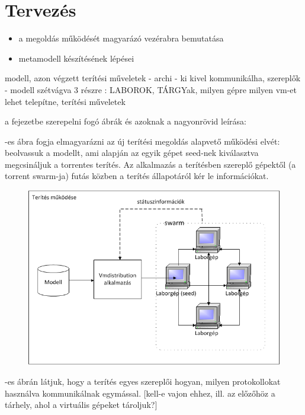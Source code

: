 \chapter{Tervezés}
\label{chp:design}
\begin{itemize}
  \item a megoldás működését magyarázó vezérabra bemutatása
  \item metamodell készítésének lépései
\end{itemize}

modell, azon végzett terítési műveletek
- archi - ki kivel kommunikálha, szereplők
- modell szétvágva 3 részre : LABOROK, TÁRGYak, milyen gépre milyen vm-et lehet telepítne, terítési műveletek

a fejezetbe szerepelni fogó ábrák és azoknak a nagyonrövid leírása:



-es ábra fogja elmagyarázni az új terítési megoldás alapvető működési elvét: beolvassuk a modellt, ami alapján az egyik gépet seed-nek kiválasztva megcsináljuk a torrentes terítés. Az alkalmazás a terítésben szereplő gépektől (a torrent swarm-ja) futás közben a terítés állapotáról kér le információkat.

\begin{figure}[ht]
	\centering
	\includegraphics[width=130mm, keepaspectratio]{figures/design_overview.png}
	\caption{}
	\label{fig:designoverview}
\end{figure}

\Aref{}-es ábrán látjuk, hogy a terítés egyes szereplői hogyan, milyen protokollokat használva kommunikálnak egymással. [kell-e vajon ehhez, ill. az előzőhöz a tárhely, ahol a virtuális gépeket tároljuk?]

